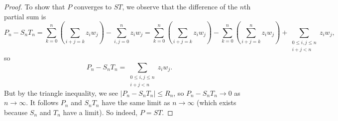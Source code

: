 \begin{proof}
	To show that $P$ converges to $ST$, we observe that the difference of the $n$th partial sum is
	\[P_n-S_nT_n=\sum_{k=0}^n\left(\sum_{i+j=k}z_iw_j\right)-\sum_{i,j=0}^nz_iw_j=\sum_{k=0}^n\left(\sum_{i+j=k}z_iw_j\right)-\sum_{k=0}^n\left(\sum_{i+j=k}^nz_iw_j\right)+\sum_{\substack{0\le i,j\le n\\i+j<n}}z_iw_j,\]
	so
	\[P_n-S_nT_n=\sum_{\substack{0\le i,j\le n\\i+j<n}}z_iw_j.\]
	But by the triangle inequality, we see $|P_n-S_nT_n|\le R_n$, so $P_n-S_nT_n\to0$ as $n\to\infty$. It follows $P_n$ and $S_nT_n$ have the same limit as $n\to\infty$ (which exists because $S_n$ and $T_n$ have a limit). So indeed, $P=ST$.
\end{proof}
